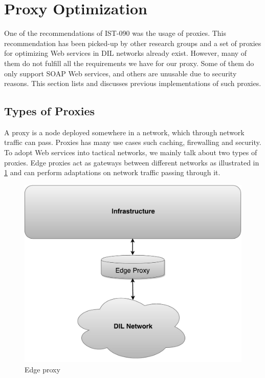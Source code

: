 \section{Proxy Optimization}

One of the recommendations of IST-090 was the usage of proxies. This
recommendation has been picked-up by other research groups and a set of proxies
for optimizing Web services in DIL networks already exist. However, many of them
do not fulfill all the requirements we have for our proxy. Some of them do only
support SOAP Web services, and others are unusable due to security reasons. This
section lists and discusses previous implementations of such proxies.

\subsection{Types of Proxies}

A proxy is a node deployed somewhere in a network, which through network traffic
can pass. Proxies has many use cases such caching, firewalling and security. To
adopt Web services into tactical networks, we mainly talk about two types of
proxies. Edge proxies act as gateways between different networks as illustrated
in \cref{figure:edge} and can perform adaptations on network traffic passing
through it.

\begin{figure}[h]
\includegraphics[scale=0.35]{images/edge_proxy.pdf}
\caption{Edge proxy}
\label{figure:edge}
\end{figure}

